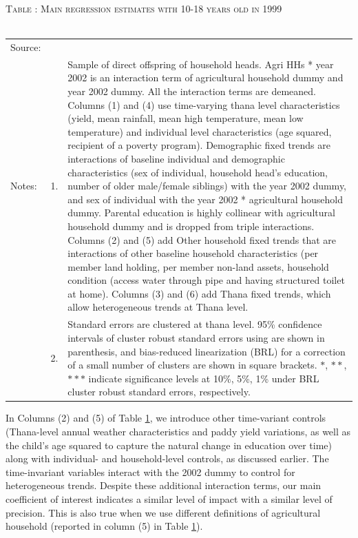 \documentclass[12pt,letterpaper]{article}
\newcommand{\0}{\ensuremath{\mbox{\boldmath $0$}}}
\begin{document}
\begin{table}
\hfil\textsc{\footnotesize Table \thetable: Main regression estimates with 10-18 years old in 1999 \\
\label{base10}}\\
\setlength{\tabcolsep}{1pt}
\renewcommand{\arraystretch}{.75}
\hfil
\renewcommand{\arraystretch}{1}
\hfil\begin{tabular}{>{\hfill\scriptsize}p{1cm}<{}>{\hfill\scriptsize}p{.5cm}<{}>{\scriptsize}p{13cm}<{\hfill}}
Source:& \multicolumn{2}{l}{\scriptsize Compiled from IFPRI data. }\\[-1ex]
Notes:& 1. & Sample of direct offspring of household heads. \textsf{Agri HHs * year 2002} is an interaction term of agricultural household dummy and year 2002 dummy. All the interaction terms are demeaned. Columns \textsf{(1) and (4)} use time-varying thana level characteristics (yield, mean rainfall, mean high temperature, mean low temperature) and individual level characteristics (age squared, recipient of a poverty program). \textsf{Demographic fixed trends} are interactions of baseline individual and demographic characteristics (sex of individual, household head's education, number of older male/female siblings) with the year 2002 dummy, and sex of individual with the year 2002 * agricultural household dummy. Parental education is highly collinear with agricultural household dummy and is dropped from triple interactions. Columns \textsf{(2) and (5)} add \textsf{Other household fixed trends} that are interactions of other baseline household characteristics (per member land holding, per member non-land assets, household condition (access water through pipe and having structured toilet at home). Columns \textsf{(3) and (6)} add \textsf{Thana fixed trends}, which allow heterogeneous trends at Thana level. \\[-1ex]
& 2. & Standard errors are clustered at thana level. 95\% confidence intervals of cluster robust standard errors using \cite{liang1986longitudinal} are shown in parenthesis, and bias-reduced linearization (BRL) for a correction of a small number of clusters are shown in square brackets. $*$, $**$, $***$ indicate significance levels at 10\%, 5\%, 1\% under BRL cluster robust standard errors, respectively.
\end{tabular}
\end{table}



In Columns (2) and (5) of Table \ref{base10}, we introduce other time-variant controls (Thana-level annual weather characteristics and paddy yield variations, as well as the child's age squared to capture the natural change in education over time) along with individual- and household-level controls, as discussed earlier. The time-invariant variables interact with the 2002 dummy to control for heterogeneous trends. Despite these additional interaction terms, our main coefficient of interest indicates a similar level of impact with a similar level of precision. This is also true when we use different definitions of agricultural household (reported in column (5) in Table \ref{base10}).
\end{document}
